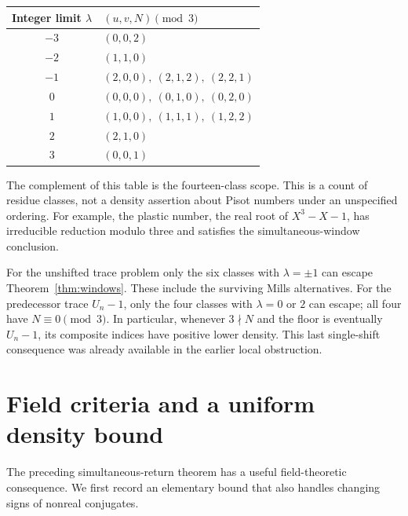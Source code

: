 \documentclass[11pt,a4paper]{article}
\theoremstyle{remark}\newtheorem{remark}[theorem]{Remark}
\begin{document}
\begin{center}
\begin{tabular}{c l}
\toprule
Integer limit $\lambda$ & $(u,v,N)\pmod3$\\
\midrule
$-3$ & $(0,0,2)$\\
$-2$ & $(1,1,0)$\\
$-1$ & $(2,0,0),\ (2,1,2),\ (2,2,1)$\\
$0$ & $(0,0,0),\ (0,1,0),\ (0,2,0)$\\
$1$ & $(1,0,0),\ (1,1,1),\ (1,2,2)$\\
$2$ & $(2,1,0)$\\
$3$ & $(0,0,1)$\\
\bottomrule
\end{tabular}
\end{center}
The complement of this table is the fourteen-class scope. This is
a count of residue classes, not a density assertion about Pisot
numbers under an unspecified ordering. For example, the plastic
number, the real root of $X^3-X-1$, has irreducible reduction modulo
three and satisfies the simultaneous-window conclusion.

For the unshifted trace problem only the six classes with
$\lambda=\pm1$ can escape Theorem~\ref{thm:windows}. These include
the surviving Mills alternatives. For the predecessor trace
$U_n-1$, only the four classes with $\lambda=0$ or $2$ can escape;
all four have $N\equiv0\pmod3$. In particular, whenever
$3\nmid N$ and the floor is eventually $U_n-1$, its composite
indices have positive lower density. This last single-shift
consequence was already available in the earlier local obstruction.

\section{Field criteria and a uniform density bound}
\label{local:sec:fields}
The preceding simultaneous-return theorem has a useful field-theoretic
consequence. We first record an elementary bound that also handles
changing signs of nonreal conjugates.
\end{document}

